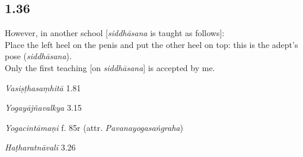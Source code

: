 \begin{ekdosis}
\subsection*{1.36}
\begin{translation}[hp01_036]
However, in another school [\emph{siddhāsana} is taught as follows]:\\

Place the left heel on the penis and put the other heel on top: this is the adept's pose (\emph{siddhāsana}).\\ 

Only the first teaching [on \emph{siddhāsana}] is accepted by me.\\

\end{translation}

\begin{sources}[hp01_036]
\emph{Vasiṣṭhasaṃhitā} 1.81

\begin{versinnote}
\end{versinnote}

\emph{Yogayājñavalkya} 3.15

\begin{versinnote}
\end{versinnote}

\end{sources}

\begin{testimonia}[hp01_036]
\emph{Yogacintāmaṇi} f. 85r (attr. \emph{Pavanayogasaṅgraha})

\begin{versinnote}
\end{versinnote}

\emph{Haṭharatnāvalī} 3.26

\begin{versinnote}
\end{versinnote}


\end{testimonia}
\end{ekdosis}
